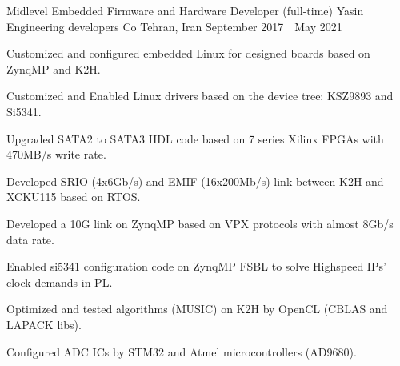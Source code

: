 \begin{cventries}
  \cventry
    {Midlevel Embedded Firmware and Hardware Developer (full-time)} %
    {Yasin Engineering developers Co} %
    {Tehran, Iran} %
    {September 2017~\textendash~May 2021} %
    {
      \begin{cvitems} %
        \item {Customized and configured embedded Linux for designed boards based on ZynqMP and K2H.}
	\item {Customized and Enabled Linux drivers based on the device tree: KSZ9893 and Si5341.}
        \item {Upgraded SATA2 to SATA3 HDL code based on 7 series Xilinx FPGAs with 470MB/s write rate.}
        \item {Developed SRIO (4x6Gb/s) and EMIF (16x200Mb/s) link between K2H and XCKU115 based on RTOS.}
	\item {Developed a 10G link on ZynqMP based on VPX protocols with almost 8Gb/s data rate.}
        \item {Enabled si5341 configuration code on ZynqMP FSBL to solve Highspeed IPs' clock demands in PL.}
	\item {Optimized and tested algorithms (MUSIC) on K2H by OpenCL (CBLAS and LAPACK libs).}
	\item {Configured ADC ICs by STM32 and Atmel microcontrollers (AD9680).}
      \end{cvitems}
    }


\end{cventries}
